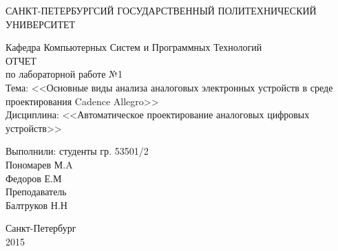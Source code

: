 \begin{center} 

\large САНКТ-ПЕТЕРБУРГСИЙ ГОСУДАРСТВЕННЫЙ ПОЛИТЕХНИЧЕСКИЙ УНИВЕРСИТЕТ

\large Кафедра Компьютерных Систем и Программных Технологий \\[4.5cm] 

\huge ОТЧЕТ \\[0.6cm] %
\large по лабораторной работе №1\\
\large Тема: <<Основные виды анализа аналоговых электронных устройств в среде проектирования Cadence Allegro>>\\
\large Дисциплина: <<Автоматическое проектирование аналоговых цифровых устройств>>\\[2.7cm]

\end{center} 

\begin{flushright}
Выполнили: студенты гр. 53501/2 \\
Пономарев М.A \\
Федоров Е.М \\[1.2cm]

Преподаватель \\
Балтруков Н.Н
\end{flushright}


\vfill 

\begin{center} 
\large Санкт-Петербург \\
2015
\end{center} 

\thispagestyle{empty}
